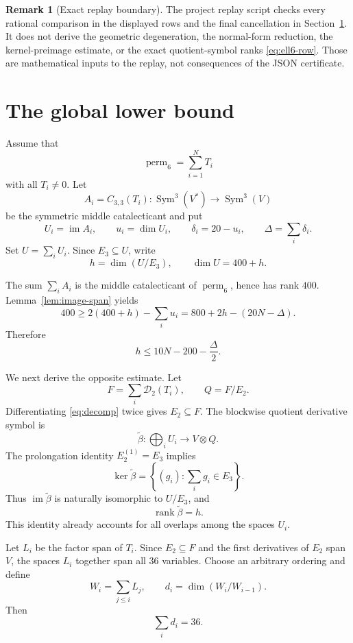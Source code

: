 \documentclass[11pt]{amsart}
\newcommand{\Sym}{\operatorname{Sym}}
\newcommand{\im}{\operatorname{im}}
\newcommand{\rank}{\operatorname{rank}}
\newcommand{\perm}{\operatorname{perm}}
\newcommand{\cD}{\mathcal{D}}
\theoremstyle{definition}
\newtheorem{remark}[theorem]{Remark}
\begin{document}
\begin{remark}[Exact replay boundary]\label{rem:boundary}
The project replay script checks every rational comparison in the displayed
rows and the final cancellation in Section~\ref{sec:global}.  It does not
derive the geometric degeneration, the normal-form reduction, the
kernel-preimage estimate, or the exact quotient-symbol ranks
\eqref{eq:ell6-row}.  Those are mathematical inputs to the replay, not
consequences of the JSON certificate.
\end{remark}

\section{The global lower bound}\label{sec:global}

Assume that
\begin{equation}\label{eq:decomp}
 \perm_6=\sum_{i=1}^{N}T_i
\end{equation}
with all \(T_i\neq0\).  Let
\[
 A_i=C_{3,3}(T_i):\Sym^3(V^*)\longrightarrow\Sym^3(V)
\]
be the symmetric middle catalecticant and put
\[
 U_i=\im A_i,\qquad u_i=\dim U_i,
 \qquad \delta_i=20-u_i,\qquad \Delta=\sum_i\delta_i.
\]
Set \(U=\sum_iU_i\).  Since \(E_3\subseteq U\), write
\[
 h=\dim(U/E_3),\qquad \dim U=400+h.
\]

The sum \(\sum_iA_i\) is the middle catalecticant of \(\perm_6\), hence
has rank \(400\).  Lemma~\ref{lem:image-span} yields
\[
 400\geq2(400+h)-\sum_i u_i
 =800+2h-(20N-\Delta).
\]
Therefore
\begin{equation}\label{eq:h-upper}
 \boxed{h\leq10N-200-\frac{\Delta}{2}.}
\end{equation}

We next derive the opposite estimate.  Let
\[
 F=\sum_i\cD_2(T_i),\qquad Q=F/E_2.
\]
Differentiating \eqref{eq:decomp} twice gives \(E_2\subseteq F\).  The
blockwise quotient derivative symbol is
\[
 \widetilde\beta:\bigoplus_iU_i\longrightarrow V\otimes Q.
\]
The prolongation identity \(E_2^{(1)}=E_3\) implies
\[
 \ker\widetilde\beta
 =\left\{(g_i):\sum_i g_i\in E_3\right\}.
\]
Thus \(\im\widetilde\beta\) is naturally isomorphic to \(U/E_3\), and
\begin{equation}\label{eq:beta-rank}
 \rank\widetilde\beta=h.
\end{equation}
This identity already accounts for all overlaps among the spaces \(U_i\).

Let \(L_i\) be the factor span of \(T_i\).  Since \(E_2\subseteq F\) and
the first derivatives of \(E_2\) span \(V\), the spaces \(L_i\) together
span all \(36\) variables.  Choose an arbitrary ordering and define
\[
 W_i=\sum_{j\leq i}L_j,
 \qquad d_i=\dim(W_i/W_{i-1}).
\]
Then
\begin{equation}\label{eq:sum-di}
 \sum_i d_i=36.
\end{equation}
\end{document}
